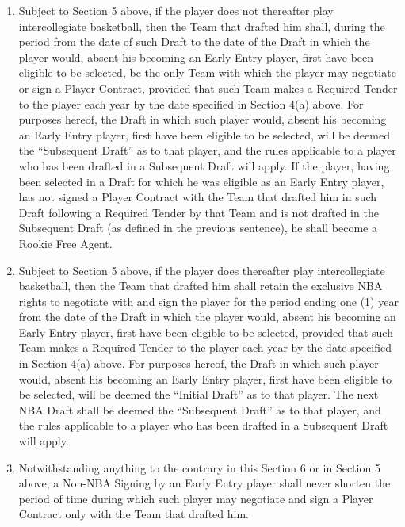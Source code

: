 \documentclass[
]{book}
\providecommand{\tightlist}{%
  \setlength{\itemsep}{0pt}\setlength{\parskip}{0pt}}
\begin{document}
\begin{enumerate}
\def\labelenumi{(\alph{enumi})}
\tightlist
\item
  Subject to Section 5 above, if the player does not thereafter play intercollegiate basketball, then the Team that drafted him shall, during the period from the date of such Draft to the date of the Draft in which the player would, absent his becoming an Early Entry player, first have been eligible to be selected, be the only Team with which the player may negotiate or sign a Player Contract, provided that such Team makes a Required Tender to the player each year by the date specified in Section 4(a) above. For purposes hereof, the Draft in which such player would, absent his becoming an Early Entry player, first have been eligible to be selected, will be deemed the ``Subsequent Draft'' as to that player, and the rules applicable to a player who has been drafted in a Subsequent Draft will apply. If the player, having been selected in a Draft for which he was eligible as an Early Entry player, has not signed a Player Contract with the Team that drafted him in such Draft following a Required Tender by that Team and is not drafted in the Subsequent Draft (as defined in the previous sentence), he shall become a Rookie Free Agent.
\item
  Subject to Section 5 above, if the player does thereafter play intercollegiate basketball, then the Team that drafted him shall retain the exclusive NBA rights to negotiate with and sign the player for the period ending one (1) year from the date of the Draft in which the player would, absent his becoming an Early Entry player, first have been eligible to be selected, provided that such Team makes a Required Tender to the player each year by the date specified in Section 4(a) above. For purposes hereof, the Draft in which such player would, absent his becoming an Early Entry player, first have been eligible to be selected, will be deemed the ``Initial Draft'' as to that player. The next NBA Draft shall be deemed the ``Subsequent Draft'' as to that player, and the rules applicable to a player who has been drafted in a Subsequent Draft will apply.
\item
  Notwithstanding anything to the contrary in this Section 6 or in Section 5 above, a Non-NBA Signing by an Early Entry player shall never shorten the period of time during which such player may negotiate and sign a Player Contract only with the Team that drafted him.
\end{enumerate}
\end{document}
